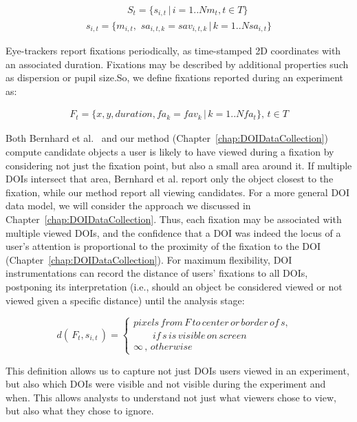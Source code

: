 \vspace{-3mm}
\begin{multline*}
\qquad\qquad\; S_t = \{s_{i,t} \,|\, i=1..N\!m_t, t \in T\} \\
s_{i,t} = \{m_{i,t}, \,\, sa_{i,t,k} = sav_{i,t,k} \,|\, k=1..N\!sa_{i,t}\}
\end{multline*}

Eye-trackers report fixations periodically, as time-stamped 2D coordinates with an associated duration. Fixations may be described by additional properties such as dispersion or pupil size.So, we define fixations reported during an experiment as:

\vspace{-5mm}
\begin{multline*}
F_t = \{x, y, duration, fa_{k} = fav_{k} \, | \, k=1..N\!fa_t\}, \, t \in T
\end{multline*}

Both Bernhard et al.~\cite{Bern14} and our method (Chapter~\ref{chap:DOIDataCollection}) compute candidate objects a user is likely to have viewed during a fixation by considering not just the fixation point, but also a small area around it. If multiple DOIs intersect that area, Bernhard et al. report only the object closest to the fixation, while our method report all viewing candidates.  For a more general DOI data model, we will consider the approach we discussed in Chapter~\ref{chap:DOIDataCollection}. Thus, each fixation may be associated with multiple viewed DOIs, and the confidence that a DOI was indeed the locus of a user's attention is proportional to the proximity of the fixation to the DOI (Chapter~\ref{chap:DOIDataCollection}). For maximum flexibility, DOI instrumentations can record the distance of users' fixations to all DOIs, postponing its interpretation (i.e., should an object be considered viewed or not viewed given a specific distance) until the analysis stage: 


$$
d(\,F_t, s_{i,t}\,) = 
\begin{cases}
pixels\,from\,F\,to\,center\,or\,border\,of\,s, & \\ \qquad if\,s\, is \, visible\,on\,screen \\ 
\infty \, , \, otherwise 
\end{cases}
$$

This definition allows us to capture not just DOIs users viewed in an experiment, but also which DOIs were visible and not visible during the experiment and when. This allows analysts to understand not just what viewers chose to view, but also what they chose to ignore. 


